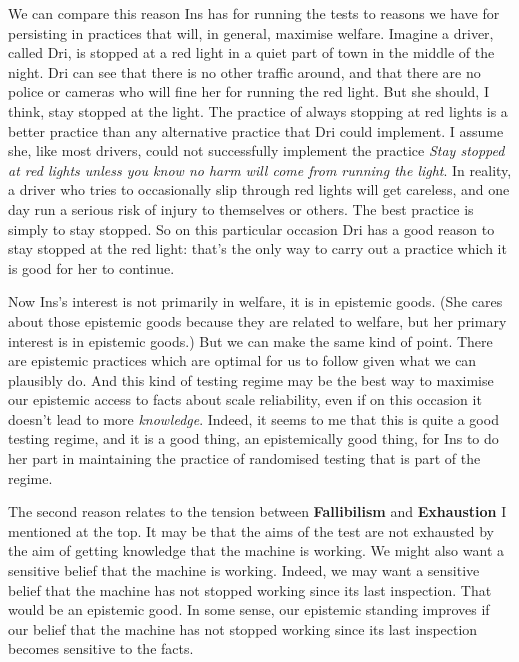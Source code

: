 We can compare this reason Ins has for running the tests to reasons we have for persisting in practices that will, in general, maximise welfare. Imagine a driver, called Dri, is stopped at a red light in a quiet part of town in the middle of the night. Dri can see that there is no other traffic around, and that there are no police or cameras who will fine her for running the red light. But she should, I think, stay stopped at the light. The practice of always stopping at red lights is a better practice than any alternative practice that Dri could implement. I assume she, like most drivers, could not successfully implement the practice \textit{Stay stopped at red lights unless you know no harm will come from running the light}. In reality, a driver who tries to occasionally slip through red lights will get careless, and one day run a serious risk of injury to themselves or others. The best practice is simply to stay stopped. So on this particular occasion Dri has a good reason to stay stopped at the red light: that's the only way to carry out a practice which it is good for her to continue.

Now Ins's interest is not primarily in welfare, it is in epistemic goods. (She cares about those epistemic goods because they are related to welfare, but her primary interest is in epistemic goods.) But we can make the same kind of point. There are epistemic practices which are optimal for us to follow given what we can plausibly do. And this kind of testing regime may be the best way to maximise our epistemic access to facts about scale reliability, even if on this occasion it doesn't lead to more \textit{knowledge}. Indeed, it seems to me that this is quite a good testing regime, and it is a good thing, an epistemically good thing, for Ins to do her part in maintaining the practice of randomised testing that is part of the regime.

The second reason relates to the tension between \textbf{Fallibilism} and \textbf{Exhaustion} I mentioned at the top. It may be that the aims of the test are not exhausted by the aim of getting knowledge that the machine is working. We might also want a sensitive belief that the machine is working. Indeed, we may want a sensitive belief that the machine has not stopped working since its last inspection. That would be an epistemic good. In some sense, our epistemic standing improves if our belief that the machine has not stopped working since its last inspection becomes sensitive to the facts.

